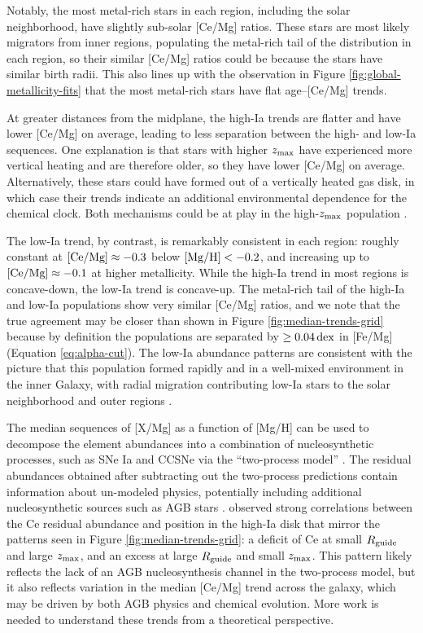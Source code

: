 \documentclass[twocolumn,twocolappendix]{aastex701}
\newcommand{\bracket}[2][H]{{\rm [#2/#1]}}
\newcommand{\dex}{\,{\rm dex}}
\begin{document}
Notably, the most metal-rich stars in each region, including the solar neighborhood, have slightly sub-solar [Ce/Mg] ratios. These stars are most likely migrators from inner regions, populating the metal-rich tail of the distribution in each region, so their similar [Ce/Mg] ratios could be because the stars have similar birth radii. This also lines up with the observation in Figure \ref{fig:global-metallicity-fits} that the most metal-rich stars have flat age--[Ce/Mg] trends.

At greater distances from the midplane, the high-Ia trends are flatter and have lower [Ce/Mg] on average, leading to less separation between the high- and low-Ia sequences. One explanation is that stars with higher $z_{\rm max}$ have experienced more vertical heating and are therefore older, so they have lower [Ce/Mg] on average. Alternatively, these stars could have formed out of a vertically heated gas disk, in which case their trends indicate an additional environmental dependence for the chemical clock. Both mechanisms could be at play in the high-$z_{\rm max}$ population \citep[e.g.,][]{bird_inside_2021}.

The low-Ia trend, by contrast, is remarkably consistent in each region: roughly constant at $\bracket[Mg]{Ce}\approx-0.3$ below $\bracket{Mg}<-0.2$, and increasing up to $\bracket[Mg]{Ce}\approx-0.1$ at higher metallicity. While the high-Ia trend in most regions is concave-down, the low-Ia trend is concave-up. The metal-rich tail of the high-Ia and low-Ia populations show very similar [Ce/Mg] ratios, and we note that the true agreement may be closer than shown in Figure \ref{fig:median-trends-grid} because by definition the populations are separated by $\ge0.04\dex$ in [Fe/Mg] (Equation \ref{eq:alpha-cut}). The low-Ia abundance patterns are consistent with the picture that this population formed rapidly and in a well-mixed environment in the inner Galaxy, with radial migration contributing low-Ia stars to the solar neighborhood and outer regions \citep[e.g.,][]{schonrich_chemical_2009,kubryk_evolution_2015,sharma_chemical_2021,chen_chemical_2023,prantzos_on_2023}.

The median sequences of [X/Mg] as a function of [Mg/H] can be used to decompose the element abundances into a combination of nucleosynthetic processes, such as SNe Ia and CCSNe via the ``two-process model'' \citep{weinberg_chemical_2019}. The residual abundances obtained after subtracting out the two-process predictions contain information about un-modeled physics, potentially including additional nucleosynthetic sources such as AGB stars \citep[e.g.,][]{griffith_residual_2022,weinberg_chemical_2022}. \citet{griffith_many_2025} observed strong correlations between the Ce residual abundance and position in the high-Ia disk that mirror the patterns seen in Figure \ref{fig:median-trends-grid}: a deficit of Ce at small $R_{\rm guide}$ and large $z_{\rm max}$, and an excess at large $R_{\rm guide}$ and small $z_{\rm max}$. This pattern likely reflects the lack of an AGB nucleosynthesis channel in the two-process model, but it also reflects variation in the median [Ce/Mg] trend across the galaxy, which may be driven by both AGB physics and chemical evolution. More work is needed to understand these trends from a theoretical perspective.
\end{document}
